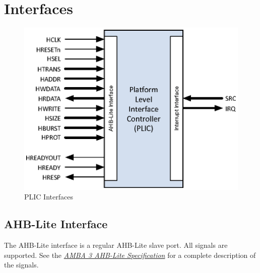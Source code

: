 \chapter{Interfaces}

\begin{figure}[!htb]
  \includegraphics{assets/img/plic-if}
  \caption{PLIC Interfaces}
  \label{fig:PLICIF}
\end{figure}

\section{AHB-Lite Interface}

The AHB-Lite interface is a regular AHB-Lite slave port. All signals are
supported. See the
\emph{\href{https://www.arm.com/products/system-ip/amba-specifications}{AMBA
		3 AHB-Lite Specification}} for a complete description of the signals.

